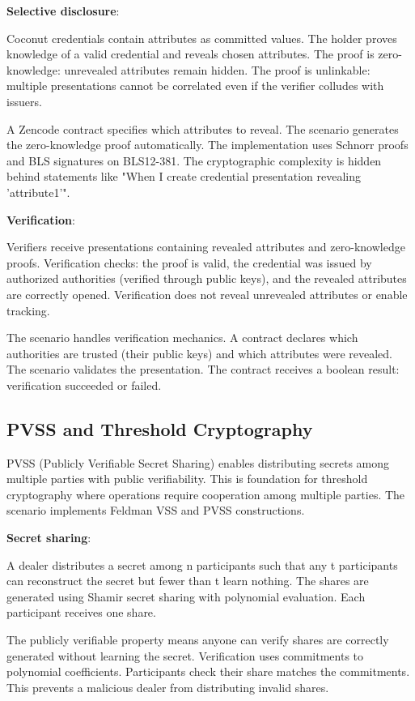 \textbf{Selective disclosure}:

Coconut credentials contain attributes as committed values. The holder
proves knowledge of a valid credential and reveals chosen
attributes. The proof is zero-knowledge: unrevealed attributes remain
hidden. The proof is unlinkable: multiple presentations cannot be
correlated even if the verifier colludes with issuers.

A Zencode contract specifies which attributes to reveal. The scenario
generates the zero-knowledge proof automatically. The implementation
uses Schnorr proofs and BLS signatures on BLS12-381. The cryptographic
complexity is hidden behind statements like "When I create credential
presentation revealing 'attribute1'".

\textbf{Verification}:

Verifiers receive presentations containing revealed attributes and
zero-knowledge proofs. Verification checks: the proof is valid, the
credential was issued by authorized authorities (verified through
public keys), and the revealed attributes are correctly
opened. Verification does not reveal unrevealed attributes or enable
tracking.

The scenario handles verification mechanics. A contract declares which
authorities are trusted (their public keys) and which attributes were
revealed. The scenario validates the presentation. The contract
receives a boolean result: verification succeeded or failed.

\subsection{PVSS and Threshold Cryptography}

PVSS (Publicly Verifiable Secret Sharing) enables distributing secrets
among multiple parties with public verifiability. This is foundation
for threshold cryptography where operations require cooperation among
multiple parties. The scenario implements Feldman VSS and PVSS
constructions.

\textbf{Secret sharing}:

A dealer distributes a secret among n participants such that any t
participants can reconstruct the secret but fewer than t learn
nothing. The shares are generated using Shamir secret sharing with
polynomial evaluation. Each participant receives one share.

The publicly verifiable property means anyone can verify shares are
correctly generated without learning the secret. Verification uses
commitments to polynomial coefficients. Participants check their share
matches the commitments. This prevents a malicious dealer from
distributing invalid shares.


